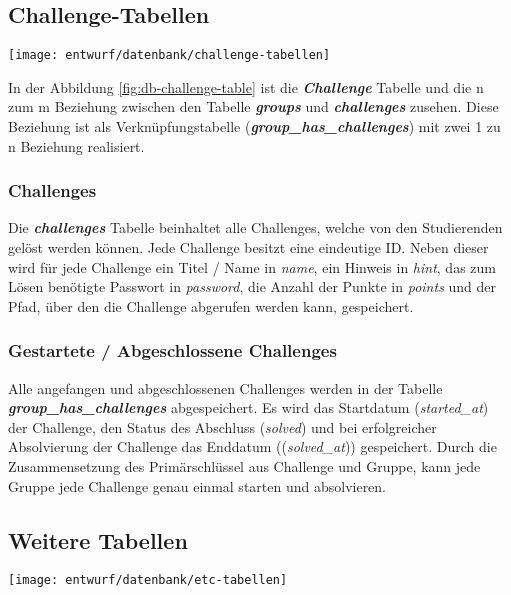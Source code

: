 \subsection{Challenge-Tabellen}
\begin{center}
	\texttt{[image: entwurf/datenbank/challenge-tabellen]}
	\label{fig:db-challenge-table}
\end{center}
In der Abbildung \ref{fig:db-challenge-table} ist die \textbf{\textit{Challenge}} Tabelle und die n zum m Beziehung zwischen den Tabelle \textbf{\textit{groups}} und \textbf{\textit{challenges}} zusehen. Diese Beziehung ist als Verknüpfungstabelle (\textbf{\textit{group\_has\_challenges}}) mit zwei 1 zu n Beziehung realisiert.

\subsubsection{Challenges}
Die \textbf{\textit{challenges}} Tabelle beinhaltet alle Challenges, welche von den Studierenden gelöst werden können. Jede Challenge besitzt eine eindeutige ID. Neben dieser wird für jede Challenge ein Titel / Name in \textit{name}, ein Hinweis in \textit{hint}, das zum Lösen benötigte Passwort in \textit{password}, die Anzahl der Punkte in \textit{points} und der Pfad, über den die Challenge abgerufen werden kann, gespeichert.

\subsubsection{Gestartete / Abgeschlossene Challenges}
Alle angefangen und abgeschlossenen Challenges werden in der Tabelle \textbf{\textit{group\_has\_challenges}} abgespeichert. Es wird das Startdatum (\textit{started\_at}) der Challenge, den Status des Abschluss (\textit{solved}) und bei erfolgreicher Absolvierung der Challenge das Enddatum ((\textit{solved\_at})) gespeichert. Durch die Zusammensetzung des Primärschlüssel aus Challenge und Gruppe, kann jede Gruppe jede Challenge genau einmal starten und absolvieren.

\subsection{Weitere Tabellen}
\begin{center}
	\texttt{[image: entwurf/datenbank/etc-tabellen]}
	\label{fig:db-etc-table}
\end{center}

